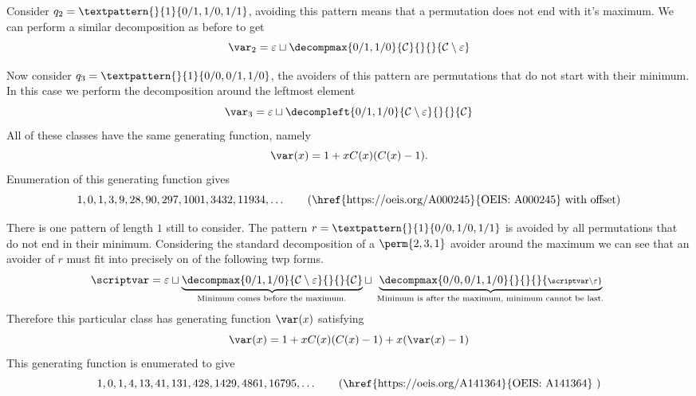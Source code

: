 Consider \(q_2 = \textpattern{}{1}{0/1,1/0,1/1}\), avoiding this pattern
means that a permutation does not end with it's maximum. We can perform a similar
decomposition as before to get
\begin{equation*}
    \mathcal{\var}_2 =\varepsilon \sqcup \decompmax{0/1,1/0}{\mathcal{C}}{}{}{\mathcal{C}\setminus\varepsilon}
\end{equation*}

Now consider \(q_3 = \textpattern{}{1}{0/0,0/1,1/0}\), the avoiders of this
pattern are permutations that do not start with their minimum. In this case we
perform the decomposition around the leftmost element
\begin{equation*}
    \mathcal{\var}_3 =\varepsilon \sqcup \decompleft{0/1,1/0}{\mathcal{C}\setminus\varepsilon}{}{}{\mathcal{C}}
\end{equation*}
All of these classes have the same generating function, namely
\begin{equation*}
    \var(x) = 1 + xC(x)(C(x)-1).
\end{equation*}
Enumeration of this generating function gives
\begin{equation*}
    1, 0, 1, 3, 9, 28, 90, 297, 1001, 3432, 11934,\dotsc \tag{\href{https://oeis.org/A000245}{OEIS: A000245} with offset}
\end{equation*}

\nextvar[\varmaxl]
There is one pattern of length \(1\) still to consider. The pattern
\(r = \textpattern{}{1}{0/0,1/0,1/1}\) is avoided by all permutations
that do not end in their minimum. Considering the standard decomposition
of a \(\perm{2,3,1}\) avoider around the maximum we can see that an avoider
of \(r\) must fit into precisely on of the following twp forms.
\begin{equation*}
    \scriptvar = \varepsilon \sqcup
    \underbrace{\decompmax{0/1,1/0}{\mathcal{C}\setminus\varepsilon}{}{}{\mathcal{C}}}_\text{
        Minimum comes before the maximum.
    } \sqcup
    \underbrace{\decompmax{0/0,0/1,1/0}{}{}{}{\scriptstyle{\scriptvar\setminus\varepsilon}}}_\text{
        Minimum is after the maximum, minimum cannot be last.
    }
\end{equation*}
Therefore this particular class has generating function \(\var(x)\) satisfying
\begin{equation*}
    \var(x) = 1 + xC(x)(C(x)-1) + x(\var(x)-1)
\end{equation*}
This generating function is enumerated to give
\begin{equation*}
    	1, 0, 1, 4, 13, 41, 131, 428, 1429, 4861, 16795,\dotsc \tag{\href{https://oeis.org/A141364}{OEIS: A141364} }
\end{equation*}

